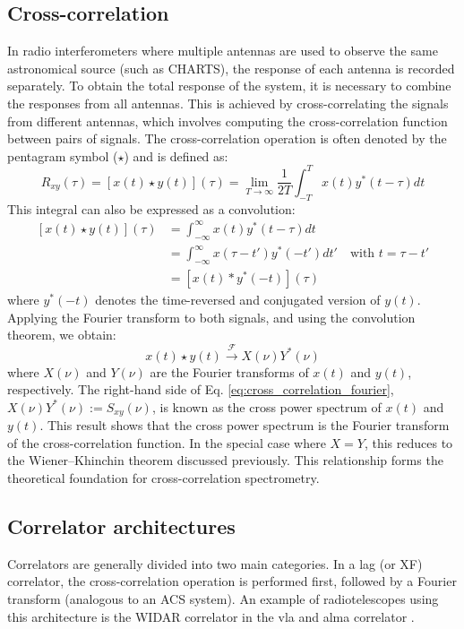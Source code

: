 \subsection{Cross-correlation}
\label{sec:cross_correlation}
In radio interferometers where multiple antennas are used to observe the same astronomical source (such as CHARTS), the response of each antenna is recorded separately. To obtain the total response of the system, it is necessary to combine the responses from all antennas. This is achieved by cross-correlating the signals from different antennas, which involves computing the cross-correlation function between pairs of signals. 
The cross-correlation operation is often denoted by the pentagram symbol ($\star$) and is defined as:
\begin{equation}
	R_{xy}(\tau)=\left[x(t) \star y(t)\right](\tau) = \lim_{T \to \infty} \frac{1}{2T} \int_{-T}^{T} x(t) y^*(t - \tau) dt
\end{equation}
This integral can also be expressed as a convolution:
\begin{align}
	\left[x(t) \star y(t)\right](\tau)
	&= \int_{-\infty}^{\infty} x(t) y^*(t - \tau) dt \\
	&= \int_{-\infty}^{\infty} x(\tau - t') y^*(-t') dt' \quad \text{with } t = \tau - t'\\
	&= \left[x(t) * y^*(-t)\right](\tau)
	\label{eq:cross_correlation}
\end{align}
where $y^*(-t)$ denotes the time-reversed and conjugated version of $y(t)$. Applying the Fourier transform to both signals, and using the convolution theorem, we obtain:
\begin{equation}
	x(t) \star y(t) \xrightarrow{\mathcal{F}} X(\nu) Y^*(\nu)
	\label{eq:cross_correlation_fourier}
\end{equation}
where $X(\nu)$ and $Y(\nu)$ are the Fourier transforms of $x(t)$ and $y(t)$, respectively. The right-hand side of Eq. \ref{eq:cross_correlation_fourier}, $X(\nu) Y^*(\nu):=S_{xy}(\nu)$, is known as the cross power spectrum of $x(t)$ and $y(t)$. This result shows that the cross power spectrum is the Fourier transform of the cross-correlation function. In the special case where $X = Y$, this reduces to the Wiener–Khinchin theorem discussed previously. This relationship forms the theoretical foundation for cross-correlation spectrometry.

\subsection{Correlator architectures}
\label{sec:spectrometer_architectures}
Correlators are generally divided into two main categories. In a lag (or XF) correlator, the cross-correlation operation is performed first, followed by a Fourier transform (analogous to an ACS system). An example of radiotelescopes using this architecture is the WIDAR correlator in the \Gls{vla} \citep{Perley_2009} and \Gls{alma} correlator \citep{ALMA_correlator}.

